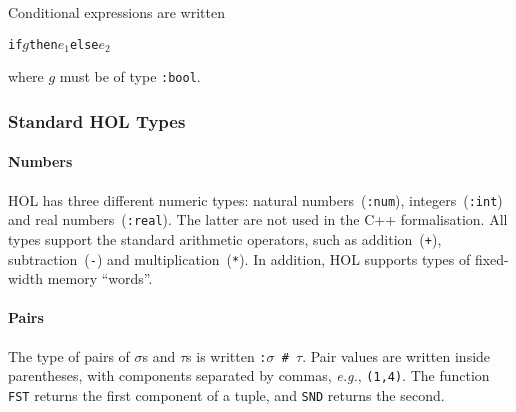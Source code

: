 \documentclass[11pt]{article}
\newcommand{\eg}{\emph{e.g.}}
\begin{document}
\vspace{1ex}
%
\noindent Conditional expressions are written
\begin{alltt}
   if \(g\) then \(e_1\) else \(e_2\)
\end{alltt}
where $g$ must be of type \texttt{:bool}.

\subsubsection{Standard HOL Types}
\label{sec:standard-hol-types}

\paragraph{Numbers} HOL has three different numeric types: natural
numbers~(\texttt{:num}), integers~(\texttt{:int}) and real
numbers~(\texttt{:real}).  The latter are not used in the C++
formalisation.  All types support the standard arithmetic operators,
such as addition~(\texttt{+}), subtraction~(\texttt{-}) and
multiplication~(\texttt{*}).  In addition, HOL supports types of
fixed-width memory ``words''.

\paragraph{Pairs} The type of pairs of $\sigma$s and $\tau$s is
written \texttt{:$\sigma$~\#~$\tau$}.  Pair values are written inside
parentheses, with components separated by commas, \eg, \texttt{(1,4)}.
 The function \texttt{FST} returns the first
component of a tuple, and \texttt{SND} returns
the second.
\end{document}

